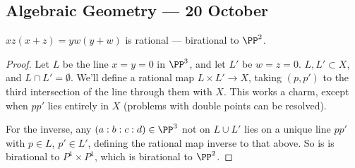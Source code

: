 \documentclass[11pt]{article}
\begin{document}
\begin{Oct20}
\section*{Algebraic Geometry --- 20 October}
\begin{exmp*}
$xz(x+z)=yw(y+w)$ is rational --- birational to $\PP^2$.
\end{exmp*}
\begin{proof}
Let $L$ be the line $x=y=0$ in $\PP^3$, and let $L'$ be $w=z=0$. $L,L'\subset X$, and $L\cap L'=\emptyset$. We'll define a rational map $L\times L'\to X$, taking $(p,p')$ to the third intersection of the line through them with $X$. This works a charm, except when $pp'$ lies entirely in $X$ (problems with double points can be resolved).

For the inverse, any $(a:b:c:d)\in\PP^3$ not on $L\cup L'$ lies on a unique line $pp'$ with $p\in L$, $p'\in L'$, defining the rational map inverse to that above. So is is birational to $P^1\times P^1$, which is birational to $\PP^2$.
\end{proof}

\end{Oct20}
\end{document}
